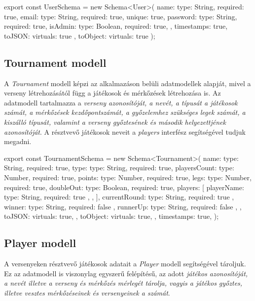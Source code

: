 \begin{cpp}
export const UserSchema = new Schema<User>(
{
    name: {type: String, required: true},
    email: {type: String, required: true, unique: true},
    password: {type: String, required: true},
    isAdmin: {type: Boolean, required: true},
}, {
    timestamps: true,
    toJSON: {
        virtuals: true
    },
    toObject: {
        virtuals: true
    }
});
\end{cpp}

\subsection{Tournament modell}
A \textit{Tournament} modell képzi az alkalmazáson belüli adatmodellek alapját, mivel a verseny létrehozásától függ a játékosok és mérkőzések létrehozása is. Az adatmodell tartalmazza a \textit{verseny azonosítóját, a nevét, a típusát a játékosok számát, a mérkőzések kezdőpontszámát, a győzelemhez szükséges legek számát, a kiszálló típusát, valamint a verseny győztesének és második helyezettjének azonosítóját}. A résztvevő játékosok neveit a \textit{players} interfész segítségével tudjuk megadni.

\begin{cpp}
export const TournamentSchema = new Schema<Tournament>(
  {
    name: {type: String, required: true},
    type: {type: String, required: true},
    playersCount: {type: Number, required: true},
    points: {type: Number, required: true},
    legs: {type: Number, required: true},
    doubleOut: {type: Boolean, required: true},
    players: [
      {
        playerName: {type: String, required: true },
      },
    ],
    currentRound: {type: String, required: true },
    winner: {type: String, required: false },
    runnerUp: {type: String, required: false },
  },
  {
    toJSON: {
      virtuals: true,
    },
    toObject: {
      virtuals: true,
    },
    timestamps: true,
  }
);
\end{cpp}

\subsection{Player modell}
A versenyeken résztvevő játékosok adatait a \textit{Player}  modell segítségével tároljuk. Ez az adatmodell is viszonylag egyszerű felépítésű, az adott \textit{játékos azonosítóját, a nevét illetve a verseny és mérkőzés mérlegét tárolja, vagyis a játékos győztes, illetve vesztes mérkőzéseinek és versenyeinek a számát}.

